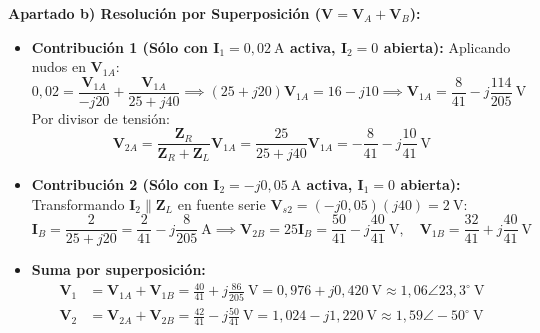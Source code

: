 \begin{ejercicio}
\vspace{4pt}
\textbf{Apartado b) Resolución por Superposición ($\mathbf{V} = \mathbf{V}_A + \mathbf{V}_B$):}
\begin{itemize}[leftmargin=*]
    \item \textbf{Contribución 1 (Sólo con $\mathbf{I}_1 = 0{,}02\ \si{\ampere}$ activa, $\mathbf{I}_2 = 0$ abierta):}
    Aplicando nudos en $\mathbf{V}_{1A}$:
    \begin{equation}
        0{,}02 = \frac{\mathbf{V}_{1A}}{-j20} + \frac{\mathbf{V}_{1A}}{25 + j40} \implies (25 + j20)\mathbf{V}_{1A} = 16 - j10 \implies \mathbf{V}_{1A} = \frac{8}{41} - j\frac{114}{205}\ \si{\volt}
    \end{equation}
    Por divisor de tensión:
    \begin{equation}
        \mathbf{V}_{2A} = \frac{\mathbf{Z}_R}{\mathbf{Z}_R + \mathbf{Z}_L} \mathbf{V}_{1A} = \frac{25}{25 + j40} \mathbf{V}_{1A} = -\frac{8}{41} - j\frac{10}{41}\ \si{\volt}
    \end{equation}
    \item \textbf{Contribución 2 (Sólo con $\mathbf{I}_2 = -j0{,}05\ \si{\ampere}$ activa, $\mathbf{I}_1 = 0$ abierta):}
    Transformando $\mathbf{I}_2 \parallel \mathbf{Z}_L$ en fuente serie $\mathbf{V}_{s2} = (-j0{,}05)(j40) = 2\ \si{\volt}$:
    \begin{equation}
        \mathbf{I}_B = \frac{2}{25 + j20} = \frac{2}{41} - j\frac{8}{205}\ \si{\ampere} \implies \mathbf{V}_{2B} = 25 \mathbf{I}_B = \frac{50}{41} - j\frac{40}{41}\ \si{\volt}, \quad \mathbf{V}_{1B} = \frac{32}{41} + j\frac{40}{41}\ \si{\volt}
    \end{equation}
    \item \textbf{Suma por superposición:}
    \begin{align}
        \mathbf{V}_1 &= \mathbf{V}_{1A} + \mathbf{V}_{1B} = \frac{40}{41} + j\frac{86}{205}\ \si{\volt} = 0{,}976 + j0{,}420\ \si{\volt} \approx 1{,}06\angle 23{,}3^\circ\ \si{\volt} \\
        \mathbf{V}_2 &= \mathbf{V}_{2A} + \mathbf{V}_{2B} = \frac{42}{41} - j\frac{50}{41}\ \si{\volt} = 1{,}024 - j1{,}220\ \si{\volt} \approx 1{,}59\angle -50^\circ\ \si{\volt}
    \end{align}
\end{itemize}


\end{ejercicio}
